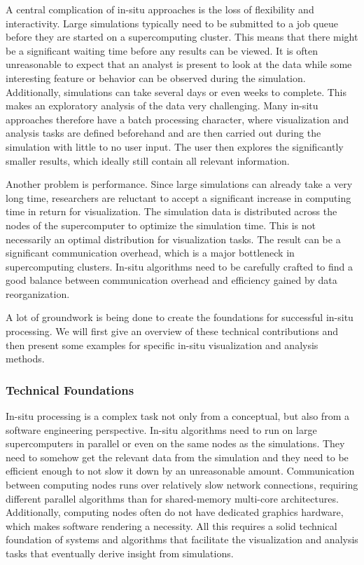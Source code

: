 %
A central complication of in-situ approaches is the loss of flexibility and
interactivity.
%
Large simulations typically need to be submitted to a job queue before they are
started on a supercomputing cluster.
%
This means that there might be a significant waiting time before any results can
be viewed.
%
It is often unreasonable to expect that an analyst is present to look at the
data while some interesting feature or behavior can be observed during the
simulation.
%
Additionally, simulations can take several days or even weeks to complete.
%
This makes an exploratory analysis of the data very challenging.
%
Many in-situ approaches therefore have a batch processing character, where
visualization and analysis tasks are defined beforehand and are then
carried out during the simulation with little to no user input.
%
The user then explores the significantly smaller results, which ideally still
contain all relevant information.
%

%
Another problem is performance.
%
Since large simulations can already take a very long time, researchers are
reluctant to accept a significant increase in computing time in return for
visualization.
%
The simulation data is distributed across the nodes of the supercomputer to
optimize the simulation time.
%
This is not necessarily an optimal distribution for visualization tasks.
%
The result can be a significant communication overhead, which is a major
bottleneck in supercomputing clusters.
%
In-situ algorithms need to be carefully crafted to find a good balance between
communication overhead and efficiency gained by data reorganization.
%

%
A lot of groundwork is being done to create the foundations for successful
in-situ processing.
%
We will first give an overview of these technical contributions and then present
some examples for specific in-situ visualization and analysis methods.
%
\subsubsection{Technical Foundations} %
\label{ssub:technical_foundations}
%
In-situ processing is a complex task not only from a conceptual, but also from a
software engineering perspective.
%
In-situ algorithms need to run on large supercomputers in parallel or even on
the same nodes as the simulations.
%
They need to somehow get the relevant data from the simulation and they need to
be efficient enough to not slow it down by an unreasonable amount.
%
Communication between computing nodes runs over relatively slow network
connections, requiring different parallel algorithms than for shared-memory
multi-core architectures.
%
Additionally, computing nodes often do not have dedicated graphics hardware,
which makes software rendering a necessity.
%
All this requires a solid technical foundation of systems and algorithms that
facilitate the visualization and analysis tasks that eventually derive insight
from simulations.
%

